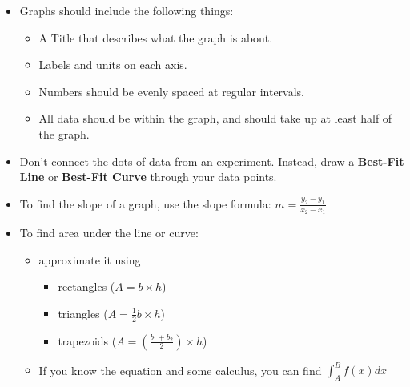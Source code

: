 \documentclass[letterpaper, 12pt]{article}
\begin{document}
\begin{itemize}
	\item Graphs should include the following things:
		\begin{itemize}
			\item A Title that describes what the graph is about.
			\item Labels and units on each axis.
			\item Numbers should be evenly spaced at regular intervals.
			\item All data should be within the graph, and should take up at least half of the graph.
		\end{itemize}
	\item Don't connect the dots of data from an experiment.  Instead, draw a \textbf{Best-Fit Line} or \textbf{Best-Fit Curve} through your data points. 

	\item To find the slope of a graph, use the slope formula: $m = \frac{y_2 - y_1}{x_2-x_1}$
	\item To find area under the line or curve:
		\begin{itemize}
			\item approximate it using
		
	 		\begin{itemize} 
	 			\item rectangles ($A = b \times h  $)
	 			\item triangles ($A = \frac{1}{2} b \times h $)
	 			\item trapezoids ($A = (\frac{b_1+b_2}{2}) \times h $)  
	 		\end{itemize}
	 		\item If you know the equation and some calculus, you can find $\int_{A}^{B} f(x) dx $
	 	\end{itemize}
	 		

\end{itemize}
\vspace{1in}
\end{document}
